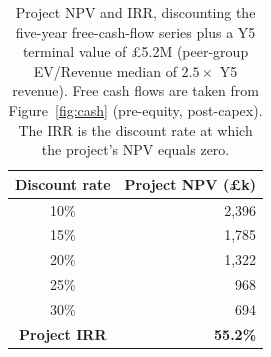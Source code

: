 \begin{table}[H]
\centering
\small
\caption{Project NPV and IRR, discounting the five-year free-cash-flow 
series plus a Y5 terminal value of \pounds5.2M (peer-group 
EV/Revenue median of $2.5\times$ Y5 revenue). Free cash flows are taken 
from Figure~\ref{fig:cash} (pre-equity, post-capex). The IRR is the 
discount rate at which the project's NPV equals zero.}
\label{tab:npv}
\begin{tabular}{cr}
\toprule
\textbf{Discount rate} & \textbf{Project NPV (\pounds k)} \\
\midrule
10\% & 2,396 \\
15\% & 1,785 \\
20\% & 1,322 \\
25\% & 968 \\
30\% & 694 \\
\midrule
\textbf{Project IRR} & \multicolumn{1}{r}{\textbf{55.2\%}} \\
\bottomrule
\end{tabular}
\end{table}
